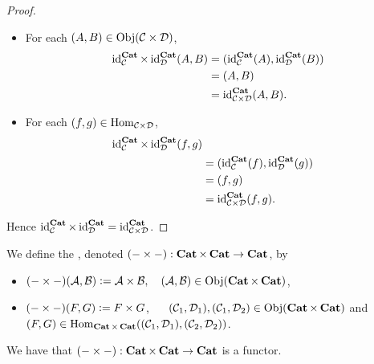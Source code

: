 \documentclass{book}
\begin{document}
	\begin{proof}\
		\begin{itemize}
			\item For each $(A,B) \in \Obj(\MC \times \MD)$,
			\begin{align*}
				\id_{\MC}^{\bCat} \times \id_{\MD}^{\bCat}(A,B)
				& = (\id_{\MC}^{\bCat}(A), \id_{\MD}^{\bCat}(B)) \\
				& = (A, B) \\
				& = \id_{\MC \times \MD}^{\bCat}(A,B).
			\end{align*}
			\item For each $(f,g) \in \Hom_{\MC \times \MD}$, 
			\begin{align*}
				\id_{\MC}^{\bCat} \times \id_{\MD}^{\bCat}(f,g) \\
				& = (\id_{\MC}^{\bCat}(f), \id_{\MD}^{\bCat}(g)) \\
				& = (f, g) \\
				& = \id_{\MC \times \MD}^{\bCat}(f,g).
			\end{align*}
		\end{itemize}
		Hence $\id_{\MC}^{\bCat} \times \id_{\MD}^{\bCat} = \id_{\MC \times \MD}^{\bCat}$.
	\end{proof}
	
	\begin{defn} 
		We define the , denoted $(- \times -): \bCat \times \bCat \rightarrow \bCat$, by 
		\begin{itemize}
			\item $(- \times -) (\MA, \MB) \defeq \MA \times \MB , \quad (\MA, \MB) \in \Obj(\bCat \times \bCat)$,
			\item $(- \times -) (F, G) \defeq F \times G$, $\quad$ $(\MC_1, \MD_1), (\MC_1, \MD_2) \in \Obj(\bCat \times \bCat)$ and $(F, G) \in \Hom_{\bCat \times \bCat}((\MC_1, \MD_1), (\MC_2, \MD_2))$.
		\end{itemize}
	\end{defn}
	
	\begin{ex} 
		We have that $(- \times -): \bCat \times \bCat \rightarrow \bCat$ is a functor.
	\end{ex}
	
\end{document}
